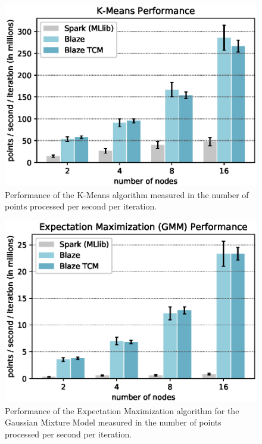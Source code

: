 \begin{figure}
  \begin{center}
  \includegraphics[width=0.7\linewidth]{figs/kmeans_speed.eps}
  \end{center}
  \vspace{-0.2cm}
  \caption{Performance of the K-Means algorithm measured in the number of points processed per second per iteration.
  }
  \label{fig:kmeans_speed}
\end{figure}
\begin{figure}
  \begin{center}
  \includegraphics[width=0.7\linewidth]{figs/em_speed.eps}
  \end{center}
  \vspace{-0.2cm}
  \caption{Performance of the Expectation Maximization algorithm for the Gaussian Mixture Model measured in the number of points processed per second per iteration.
  }
  \label{fig:em}
\end{figure}
